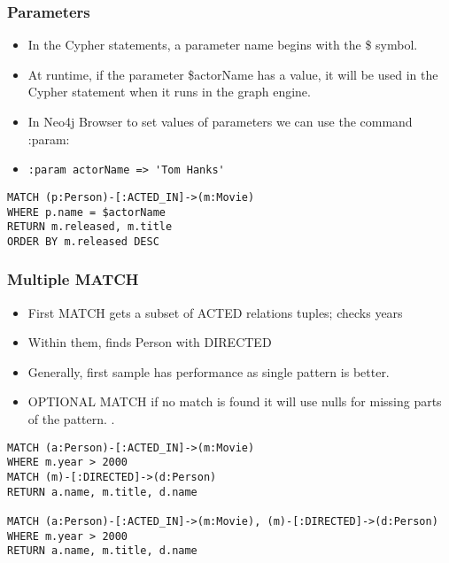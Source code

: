 \begin{frame}[fragile]\frametitle{Parameters}

\begin{itemize}
\item In the Cypher statements, a parameter name begins with the \$ symbol.
\item At runtime, if the parameter \$actorName has a value, it will be used in the Cypher statement when it runs in the graph engine.
\item In Neo4j Browser to set values of parameters we can use the command :param:
\item \lstinline|:param actorName => 'Tom Hanks'|
\end{itemize}

\begin{lstlisting}
MATCH (p:Person)-[:ACTED_IN]->(m:Movie)
WHERE p.name = $actorName
RETURN m.released, m.title
ORDER BY m.released DESC
\end{lstlisting}

\end{frame}

\begin{frame}[fragile]\frametitle{Multiple MATCH}

\begin{itemize}
\item First MATCH gets a subset of ACTED relations tuples; checks years
\item Within them, finds Person with DIRECTED
\item Generally, first sample has performance as single pattern is better.
\item OPTIONAL MATCH if no match is found it will use nulls for missing parts of the pattern. .
\end{itemize}

\begin{lstlisting}
MATCH (a:Person)-[:ACTED_IN]->(m:Movie)
WHERE m.year > 2000
MATCH (m)-[:DIRECTED]->(d:Person)
RETURN a.name, m.title, d.name

MATCH (a:Person)-[:ACTED_IN]->(m:Movie), (m)-[:DIRECTED]->(d:Person)
WHERE m.year > 2000
RETURN a.name, m.title, d.name
\end{lstlisting}

\end{frame}


